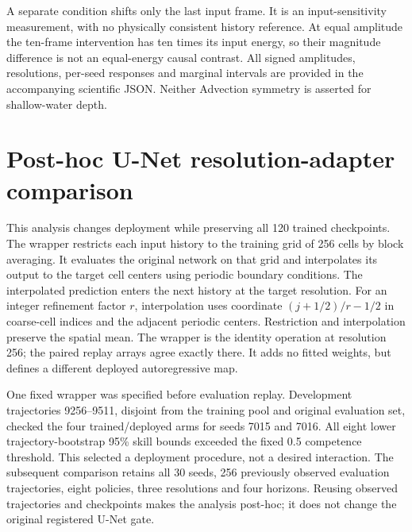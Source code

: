 \documentclass{article}
\begin{document}
\begin{table}[H]\centering\small
\caption{Normalized whole-history constant-shift residual at OOD-512. Smaller values mean closer
constant-shift equivariance, independently of exact output conservation.}
\label{tab:revision-history}
\par\medskip

\end{table}

\begin{table}[H]\centering\small
\caption{Advecting-sine residual at OOD-512, relative to the nonzero analytic conserving response.
Intervals are descriptive 95\% crossed bootstrap intervals.}

\end{table}

A separate condition shifts only the last input frame. It is an input-sensitivity measurement,
with no physically consistent history reference. At equal amplitude the ten-frame intervention
has ten times its input energy, so their magnitude difference is not an equal-energy causal
contrast. All signed amplitudes, resolutions, per-seed responses and marginal intervals are
provided in the accompanying scientific JSON. Neither Advection symmetry is asserted for
shallow-water depth.

\section{Post-hoc U-Net resolution-adapter comparison}
\label{app:resolution-adapter}

This analysis changes deployment while preserving all 120 trained checkpoints. The wrapper
restricts each input history to the training grid of 256 cells by block averaging. It evaluates
the original network on that grid and interpolates its output to the target cell
centers using periodic boundary conditions. The interpolated prediction enters the next history at the target resolution. For an
integer refinement factor $r$, interpolation uses coordinate $(j+1/2)/r-1/2$ in coarse-cell
indices and the adjacent periodic centers. Restriction and interpolation preserve the spatial
mean. The wrapper is the identity operation at resolution 256; the paired replay arrays agree
exactly there. It adds no fitted weights, but defines a different deployed autoregressive map.

One fixed wrapper was specified before evaluation replay. Development trajectories 9256--9511,
disjoint from the training pool and original evaluation set, checked the four trained/deployed
arms for seeds 7015 and 7016. All eight lower trajectory-bootstrap 95\% skill bounds exceeded the
fixed 0.5 competence threshold. This selected a deployment procedure, not a desired interaction.
The subsequent comparison retains all 30 seeds, 256 previously observed evaluation trajectories,
eight policies, three resolutions and four horizons. Reusing observed trajectories and checkpoints
makes the analysis post-hoc; it does not change the original registered U-Net gate.
\end{document}
